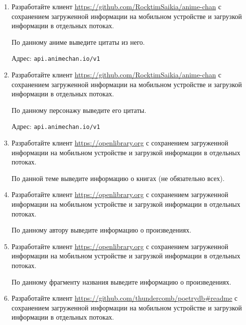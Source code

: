 \begin{enumerate}

	\item Разработайте клиент \url{https://github.com/RocktimSaikia/anime-chan} с сохранением загруженной информации на мобильном устройстве и загрузкой
		информации в отдельных потоках. 

		По данному аниме выведите цитаты из него.

		Адрес: \verb|api.animechan.io/v1|


	\item Разработайте клиент \url{https://github.com/RocktimSaikia/anime-chan} с сохранением загруженной информации на мобильном устройстве и загрузкой
		информации в отдельных потоках. 

		По данному персонажу выведите его цитаты.

		
		Адрес: \verb|api.animechan.io/v1|

	\item Разработайте клиент \url{https://openlibrary.org} с сохранением загруженной информации на мобильном устройстве и загрузкой
		информации в отдельных потоках. 

		По данной теме выведите информацию о книгах (не обязательно всех).

	\item Разработайте клиент \url{https://openlibrary.org} с сохранением загруженной информации на мобильном устройстве и загрузкой
		информации в отдельных потоках. 

		По данному автору выведите информацию о произведениях.

	\item Разработайте клиент \url{https://openlibrary.org} с сохранением загруженной информации на мобильном устройстве и загрузкой
		информации в отдельных потоках. 

		По данному фрагменту названия выведите информацию о произведениях.

	\item Разработайте клиент \url{https://github.com/thundercomb/poetrydb#readme} с сохранением загруженной информации на мобильном устройстве и загрузкой
		информации в отдельных потоках. 


\end{enumerate}
